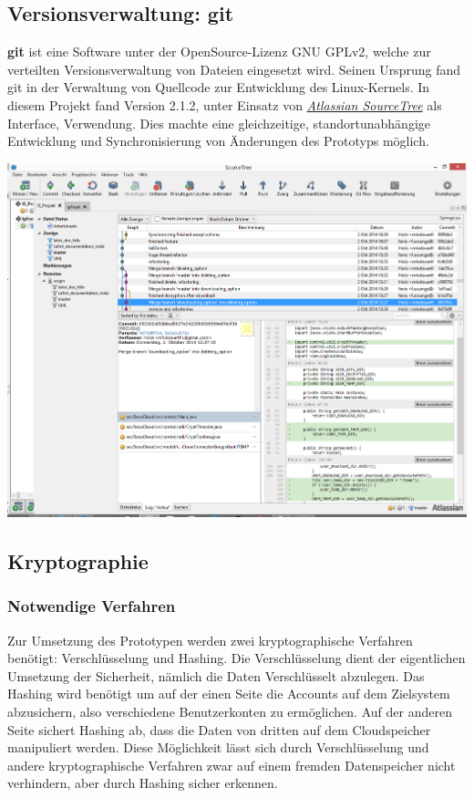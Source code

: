 \documentclass[13pt,a4paper,bibliography=totocnumbered,listof=totocnumbered]{scrartcl}
\begin{document}
\subsection{Versionsverwaltung: git}
\textbf{git} ist eine Software unter der OpenSource-Lizenz GNU GPLv2, welche zur verteilten Versionsverwaltung von Dateien eingesetzt wird. Seinen Ursprung fand git in der Verwaltung von Quellcode zur Entwicklung des Linux-Kernels. In diesem Projekt fand Version 2.1.2, unter Einsatz von \href{https://www.atlassian.com/software/sourcetree/overview}{\textit{Atlassian SourceTree}} als Interface, Verwendung. Dies machte eine gleichzeitige, standortunabhängige Entwicklung und Synchronisierung von Änderungen des Prototyps möglich.
\vspace{1em}
$\;$\\
\begin{minipage}{\linewidth}
	\centering
	\includegraphics[width=1.0\linewidth]{./img/SourceTree.png}
\end{minipage}
\vspace{1em}
  \cite{31}

\subsection{Kryptographie}
\subsubsection{Notwendige Verfahren}
Zur Umsetzung des Prototypen werden zwei kryptographische Verfahren benötigt: Verschlüsselung und Hashing. Die Verschlüsselung dient der eigentlichen Umsetzung der Sicherheit, nämlich die Daten Verschlüsselt abzulegen. Das Hashing wird benötigt um auf der einen Seite die Accounts auf dem Zielsystem abzusichern, also verschiedene Benutzerkonten zu ermöglichen. Auf der anderen Seite sichert Hashing ab, dass die Daten von dritten auf dem Cloudspeicher manipuliert werden. Diese Möglichkeit lässt sich durch Verschlüsselung und andere kryptographische Verfahren zwar auf einem fremden Datenspeicher nicht verhindern, aber durch Hashing sicher erkennen.
\end{document}
